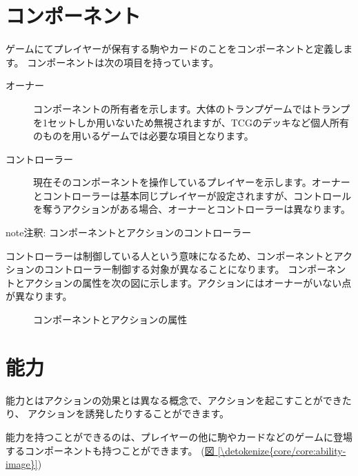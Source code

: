 \documentclass[letterpaper,10pt,dvipdfmx]{sphinxmanual}
\begin{document}
\section{コンポーネント}
\label{\detokenize{core/core:component}}\label{\detokenize{core/core:id12}}
ゲームにてプレイヤーが保有する駒やカードのことをコンポーネントと定義します。
コンポーネントは次の項目を持っています。
\begin{description}
\item[{オーナー}] \leavevmode
コンポーネントの所有者を示します。大体のトランプゲームではトランプを1セットしか用いないため無視されますが、TCGのデッキなど個人所有のものを用いるゲームでは必要な項目となります。

\item[{コントローラー}] \leavevmode
現在そのコンポーネントを操作しているプレイヤーを示します。オーナーとコントローラーは基本同じプレイヤーが設定されますが、コントロールを奪うアクションがある場合、オーナーとコントローラーは異なります。

\end{description}

\begin{sphinxadmonition}{note}{注釈:}
コンポーネントとアクションのコントローラー

コントローラーは制御している人という意味になるため、コンポーネントとアクションのコントローラー制御する対象が異なることになります。
コンポーネントとアクションの属性を次の図に示します。アクションにはオーナーがいない点が異なります。

\begin{figure}[H]
\centering
\capstart

\noindent{}
\caption{コンポーネントとアクションの属性}\label{\detokenize{core/core:id17}}\end{figure}
\end{sphinxadmonition}


\section{能力}
\label{\detokenize{core/core:id13}}
能力とはアクションの効果とは異なる概念で、アクションを起こすことができたり、
アクションを誘発したりすることができます。

能力を持つことができるのは、プレイヤーの他に駒やカードなどのゲームに登場するコンポーネントも持つことができます。
(\hyperref[\detokenize{core/core:ability-image}]{図 \ref{\detokenize{core/core:ability-image}}})
\end{document}
